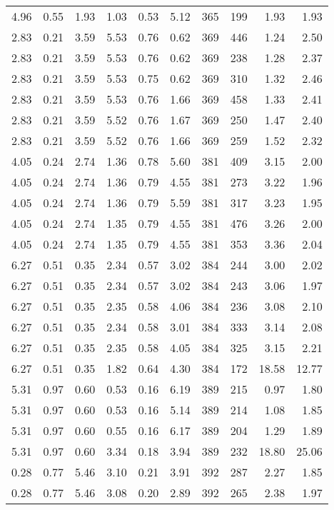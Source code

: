\begin{longtable}{rrrrrrrrrr}
4.96	&	0.55	&	1.93	&	1.03	&	0.53	&	5.12	&	365	&	199	&	1.93	&	1.93	\\
2.83	&	0.21	&	3.59	&	5.53	&	0.76	&	0.62	&	369	&	446	&	1.24	&	2.50	\\
2.83	&	0.21	&	3.59	&	5.53	&	0.76	&	0.62	&	369	&	238	&	1.28	&	2.37	\\
2.83	&	0.21	&	3.59	&	5.53	&	0.75	&	0.62	&	369	&	310	&	1.32	&	2.46	\\
2.83	&	0.21	&	3.59	&	5.53	&	0.76	&	1.66	&	369	&	458	&	1.33	&	2.41	\\
2.83	&	0.21	&	3.59	&	5.52	&	0.76	&	1.67	&	369	&	250	&	1.47	&	2.40	\\
2.83	&	0.21	&	3.59	&	5.52	&	0.76	&	1.66	&	369	&	259	&	1.52	&	2.32	\\
4.05	&	0.24	&	2.74	&	1.36	&	0.78	&	5.60	&	381	&	409	&	3.15	&	2.00	\\
4.05	&	0.24	&	2.74	&	1.36	&	0.79	&	4.55	&	381	&	273	&	3.22	&	1.96	\\
4.05	&	0.24	&	2.74	&	1.36	&	0.79	&	5.59	&	381	&	317	&	3.23	&	1.95	\\
4.05	&	0.24	&	2.74	&	1.35	&	0.79	&	4.55	&	381	&	476	&	3.26	&	2.00	\\
4.05	&	0.24	&	2.74	&	1.35	&	0.79	&	4.55	&	381	&	353	&	3.36	&	2.04	\\
6.27	&	0.51	&	0.35	&	2.34	&	0.57	&	3.02	&	384	&	244	&	3.00	&	2.02	\\
6.27	&	0.51	&	0.35	&	2.34	&	0.57	&	3.02	&	384	&	243	&	3.06	&	1.97	\\
6.27	&	0.51	&	0.35	&	2.35	&	0.58	&	4.06	&	384	&	236	&	3.08	&	2.10	\\
6.27	&	0.51	&	0.35	&	2.34	&	0.58	&	3.01	&	384	&	333	&	3.14	&	2.08	\\
6.27	&	0.51	&	0.35	&	2.35	&	0.58	&	4.05	&	384	&	325	&	3.15	&	2.21	\\
6.27	&	0.51	&	0.35	&	1.82	&	0.64	&	4.30	&	384	&	172	&	18.58	&	12.77	\\
5.31	&	0.97	&	0.60	&	0.53	&	0.16	&	6.19	&	389	&	215	&	0.97	&	1.80	\\
5.31	&	0.97	&	0.60	&	0.53	&	0.16	&	5.14	&	389	&	214	&	1.08	&	1.85	\\
5.31	&	0.97	&	0.60	&	0.55	&	0.16	&	6.17	&	389	&	204	&	1.29	&	1.89	\\
5.31	&	0.97	&	0.60	&	3.34	&	0.18	&	3.94	&	389	&	232	&	18.80	&	25.06	\\
0.28	&	0.77	&	5.46	&	3.10	&	0.21	&	3.91	&	392	&	287	&	2.27	&	1.85	\\
0.28	&	0.77	&	5.46	&	3.08	&	0.20	&	2.89	&	392	&	265	&	2.38	&	1.97	\\

\end{longtable}
